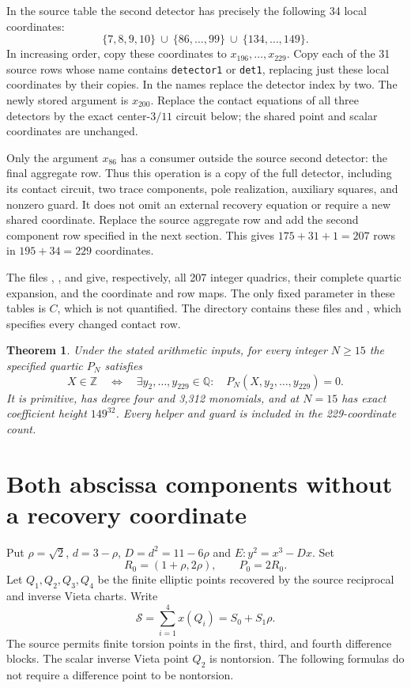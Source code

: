 \documentclass[11pt,a4paper]{article}
\newtheorem{theorem}{Theorem}[section]
\newcommand{\Q}{\mathbb Q}\newcommand{\Z}{\mathbb Z}
\begin{document}
In the source table the second detector has precisely the following
34 local coordinates:
\[
 \{7,8,9,10\}\ \cup\ \{86,\ldots,99\}
 \ \cup\ \{134,\ldots,149\}.
\]
In increasing order, copy these coordinates to
$x_{196},\ldots,x_{229}$. Copy each of the 31 source rows whose
name contains \texttt{detector1} or \texttt{det1}, replacing just
these local coordinates by their copies. In the names replace the
detector index by two. The newly stored argument is $x_{200}$.
Replace the contact equations of all three detectors by the exact
center-$3/11$ circuit below; the shared point and scalar coordinates
are unchanged.

Only the argument $x_{86}$ has a consumer outside the source second
detector: the final aggregate row. Thus this operation is a copy of
the full detector, including its contact circuit, two trace
components, pole realization, auxiliary squares, and nonzero guard.
It does not omit an external recovery equation or require a new
shared coordinate. Replace the source aggregate row and add the
second component row specified in the next section. This gives
$175+31+1=207$ rows in $195+34=229$ coordinates.

The files , , and
 give, respectively, all 207 integer quadrics,
their complete quartic expansion, and the coordinate and row maps.
The only fixed parameter in these tables is $C$, which is not
quantified. The directory
 contains these files and
, which specifies every changed contact row.

\begin{theorem}\label{thm:source}
Under the stated arithmetic inputs, for every integer $N\ge15$ the
specified quartic $P_N$ satisfies
\[
 X\in\Z\quad\Longleftrightarrow\quad
 \exists y_2,\ldots,y_{229}\in\Q:\quad
 P_N(X,y_2,\ldots,y_{229})=0.
\]
It is primitive, has degree four and 3,312 monomials, and at $N=15$
has exact coefficient height $149^{32}$. Every helper and guard is
included in the 229-coordinate count.
\end{theorem}

\section{Both abscissa components without a recovery coordinate}

Put $\rho=\sqrt2$, $d=3-\rho$, $D=d^2=11-6\rho$ and
$E:y^2=x^3-Dx$. Set
\[
 R_0=(1+\rho,2\rho),\qquad P_0=2R_0.
\]
Let $Q_1,Q_2,Q_3,Q_4$ be the finite elliptic
points recovered by the source reciprocal and inverse Vieta charts.
Write
\[
 \mathcal S=\sum_{i=1}^4 x(Q_i)=S_0+S_1\rho.
\]
The source permits finite torsion points in the first, third, and
fourth difference blocks. The scalar inverse Vieta point $Q_2$
is nontorsion. The following formulas do not require a difference
point to be nontorsion.
\end{document}
